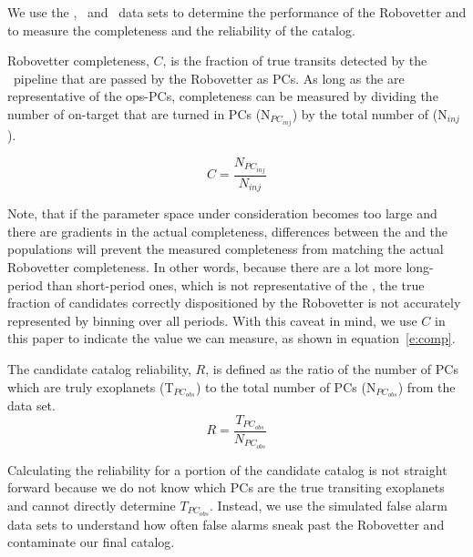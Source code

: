 %

\newcommand{\opsfp}{N$_{FP_{obs}}$}
\newcommand{\opspc}{N$_{PC_{obs}}$}
\newcommand{\opsN}{N$_{obs}$}
\newcommand{\trueopspc}{T$_{PC_{obs}}$}
\newcommand{\missedfp}{T$_{FP_{obs}}$ - N$_{FP_{obs}}$}
\newcommand{\invfp}{N$_{FP_{inv}}$}
\newcommand{\invpc}{N$_{PC_{inv}}$}
\newcommand{\invN}{N$_{inv}$}
\newcommand{\sfatce}{SFA-TCE}


We use the \injtce, \scrtce\ and \invtce\ data sets to determine the performance of the Robovetter and to measure the completeness and the reliability of the catalog. 

{\color{blue}
Robovetter completeness, $C$, is the fraction of true transits detected by the \Kepler\ pipeline that are passed by the Robovetter as PCs.  As long as the  are representative of the ops-PCs, completeness can be measured by dividing the number of on-target  that are turned in PCs (N$_{PC_{inj}}$) by the total number of  (N$_{inj}$).

\begin{equation}
C = \frac{N_{PC_{inj}}}{N_{inj}}
\label{e:comp}
\end{equation}

\noindent Note, that if the parameter space under consideration becomes too large and there are gradients in the actual completeness, differences between the \injtce and the \opstce{} populations will prevent the measured completeness from matching the actual Robovetter completeness. In other words, because there are a lot more long-period  than short-period ones, which is not representative of the , the true fraction of candidates correctly dispositioned by the Robovetter is not accurately represented by binning over all periods. With this caveat in mind, we use $C$ in this paper to indicate the value we can measure, as shown in equation~\ref{e:comp}.
}

The candidate catalog reliability, $R$, is defined as the ratio of the number of PCs which are truly exoplanets (\trueopspc) to the total number of PCs (\opspc) from the \opstce{} data set. 
\begin{equation}
\label{eq:rel}
R = \frac{T_{PC_{obs}}}{N_{PC_{obs}}}
\end{equation}

Calculating the reliability for a portion of the candidate catalog is not straight forward because we do not know which PCs are the true transiting exoplanets and cannot directly determine $T_{PC_{obs}}$. Instead, we use the simulated false alarm data sets to understand how often false alarms sneak past the Robovetter and contaminate our final catalog.


